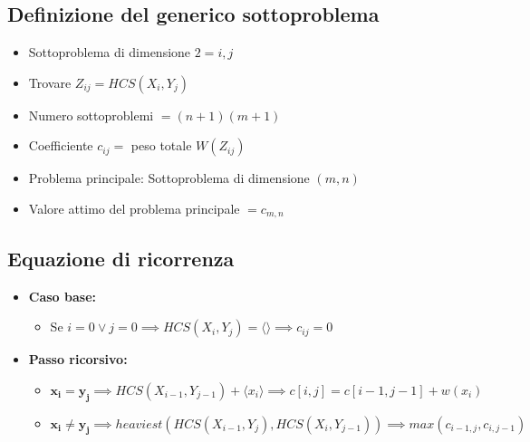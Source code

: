 \subsection{Definizione del generico sottoproblema}
\begin{itemize}
    \item Sottoproblema di dimensione $2=i,j$
    \item Trovare $Z_{ij}=HCS(X_i,Y_j)$
    \item Numero sottoproblemi $= (n+1)(m+1)$
    \item Coefficiente  $c_{ij} = $ peso totale $W(Z_{ij})$
    \item Problema principale: Sottoproblema di dimensione $(m,n)$
    \item Valore attimo del problema principale $= c_{m,n}$
\end{itemize}

\subsection{Equazione di ricorrenza}
\begin{itemize}
    \item \textbf{Caso base:}
    \begin{itemize}
        \item Se $i = 0 \lor j=0 \implies HCS(X_i,Y_j) = \langle \rangle \implies c_{ij} = 0$
    \end{itemize}
    \item \textbf{Passo ricorsivo:}
    \begin{itemize}
        \item $\mathbf{x_i = y_j} \implies HCS(X_{i-1},Y_{j-1}) + \langle x_i \rangle \implies c[i,j] = c[i-1,j-1] + w(x_i)$ 
        \item $\mathbf{x_i \not = y_j} \implies heaviest(HCS(X_{i-1},Y_j), HCS(X_i,Y_{j-1})) \implies max(c_{i-1,j},c_{i,j-1})$
    \end{itemize} 
\end{itemize}

